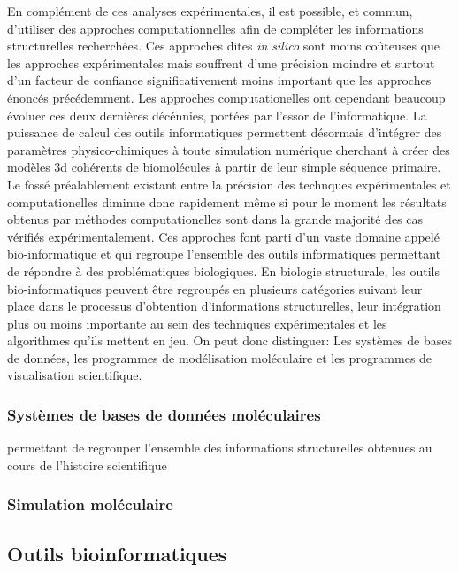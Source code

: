 En complément de ces analyses expérimentales, il est possible, et commun, d'utiliser des approches computationnelles afin de compléter les informations structurelles recherchées. Ces approches dites \textit{in silico} sont moins coûteuses que les approches expérimentales mais souffrent d'une précision moindre et surtout d'un facteur de confiance significativement moins important que les approches énoncés précédemment. Les approches computationelles ont cependant beaucoup évoluer ces deux dernières décénnies, portées par l'essor de l'informatique. La puissance de calcul des outils informatiques permettent désormais d'intégrer des paramètres physico-chimiques à toute simulation numérique cherchant à créer des modèles 3d cohérents de biomolécules à partir de leur simple séquence primaire. Le fossé préalablement existant entre la précision des technques expérimentales et computationelles diminue donc rapidement même si pour le moment les résultats obtenus par méthodes computationelles sont dans la grande majorité des cas vérifiés expérimentalement. Ces approches font parti d'un vaste domaine appelé bio-informatique et qui regroupe l'ensemble des outils informatiques permettant de répondre à des problématiques biologiques. En biologie structurale, les outils bio-informatiques peuvent être regroupés en plusieurs catégories suivant leur place dans le processus d'obtention d'informations structurelles, leur intégration plus ou moins importante au sein des techniques expérimentales et les algorithmes qu'ils mettent en jeu. On peut donc distinguer: Les systèmes de bases de données, les programmes de modélisation moléculaire et les programmes de visualisation scientifique.

\subsubsection{Systèmes de bases de données moléculaires}

permettant de regrouper l'ensemble des informations structurelles obtenues au cours de l'histoire scientifique

\subsubsection{Simulation moléculaire}

\subsection{Outils bioinformatiques}

